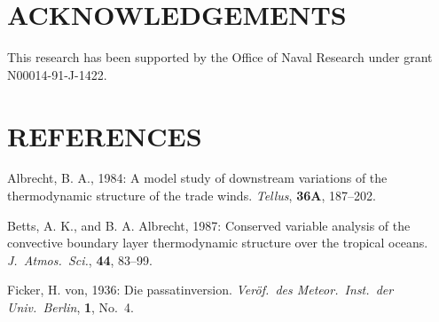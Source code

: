 \section{ACKNOWLEDGEMENTS} 

This research has been supported by the Office of Naval Research under  
grant N00014-91-J-1422.

\section{REFERENCES}

\begin{references}



Albrecht, B. A., 1984:  A model study of downstream variations of the
thermodynamic structure of the trade winds.  {\sl Tellus},
{\bf 36A}, 187--202.



Betts, A. K., and B. A. Albrecht, 1987:  Conserved variable analysis of the
convective boundary layer thermodynamic structure over the tropical oceans. 
{\sl J.\ Atmos.\ Sci.}, {\bf 44}, 83--99.




Ficker, H. von, 1936: Die passatinversion. {\sl Ver\"of.\ des Meteor.\ Inst.\
der Univ.\ Berlin}, {\bf 1}, No.~4.


\end{references}
